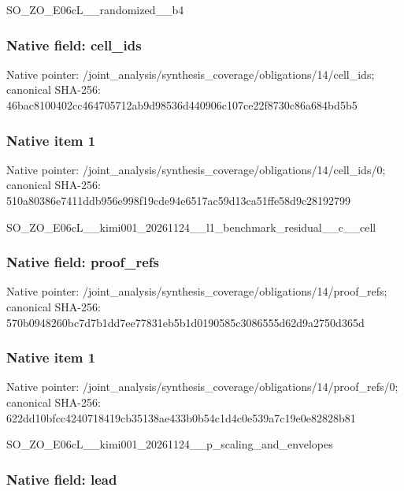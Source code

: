 \documentclass[10pt,a4paper]{article}
\begin{document}
SO\_ZO\_E06cL\_\_randomized\_\_b4


\subsubsection{Native field: cell\_ids}


Native pointer: /joint\_analysis/synthesi\allowbreak{}s\_coverage/obligations/1\allowbreak{}4/cell\_ids; canonical SHA-256: 46bac8100402cc464705712a\allowbreak{}b9d98536d440906c107ce22f\allowbreak{}8730c86a684bd5b5



\subsubsection{Native item 1}


Native pointer: /joint\_analysis/synthesi\allowbreak{}s\_coverage/obligations/1\allowbreak{}4/cell\_ids/0; canonical SHA-256: 510a80386e7411ddb956e998\allowbreak{}f19cde94e6517ac59d13ca51\allowbreak{}ffe58d9c28192799


SO\_ZO\_E06cL\_\_kimi001\_202\allowbreak{}61124\_\_l1\_benchmark\_resi\allowbreak{}dual\_\_c\_\_cell


\subsubsection{Native field: proof\_refs}


Native pointer: /joint\_analysis/synthesi\allowbreak{}s\_coverage/obligations/1\allowbreak{}4/proof\_refs; canonical SHA-256: 570b0948260bc7d7b1dd7ee7\allowbreak{}7831eb5b1d0190585c308655\allowbreak{}5d62d9a2750d365d



\subsubsection{Native item 1}


Native pointer: /joint\_analysis/synthesi\allowbreak{}s\_coverage/obligations/1\allowbreak{}4/proof\_refs/0; canonical SHA-256: 622dd10bfcc4240718419cb3\allowbreak{}5138ae433b0b54c1d4c0e539\allowbreak{}a7c19e0e82828b81


SO\_ZO\_E06cL\_\_kimi001\_202\allowbreak{}61124\_\_p\_scaling\_and\_env\allowbreak{}elopes


\subsubsection{Native field: lead}
\end{document}
